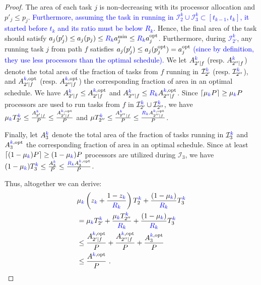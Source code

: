 \documentclass{article}
\newcommand\ratio{R\xspace}
\newcommand\opt{\textnormal{opt}\xspace}
\newcommand{\new}[1]{\textcolor{blue}{#1}}
\begin{document}
\begin{proof}
The area of each task $j$  is non-decreasing with its processor allocation and $p'_j \le p_j$.  \new{Furthermore, assuming the task in running in $\mathcal{I}_{2}^{k} \cup \mathcal{I}_{3}^{k} \subset [t_{k-1},t_k]$, it started before $t_k$ and its ratio must be below $\ratio_k$}. Hence, the final area of the task should satisfy $a_j(p'_j) \le a_j(p_j) \le \new{\ratio_k} a_j^{\min} \leq \new{\ratio_k} a_j^{\opt}$. Furthermore, during \new{$\mathcal{I}_{2'}^k$}, any running task $j$ from path $f$ satisfies $a_j(p'_j) \leq a_j(p_j^{\opt})=a_j^{\opt}$ \new{(since by definition, they use less processors than the optimal schedule).} We let $A_{2'|f}^{\new{k}}$ (resp. $A_{2''|f}^{\new{k}}$) denote the total area of the fraction of tasks from $f$ running in $\mathcal{I}_{2'}^{\new{k}}$ (resp. $\mathcal{I}_{2''}^{\new{k}}$), and $A^{{\new{k}},\opt}_{2'|f}$ (resp. $A^{{\new{k}},\opt}_{2''|f}$) the corresponding fraction of area in an optimal schedule. We have $A_{2'|f}^{\new{k}} \leq A^{{\new{k}},\opt}_{2'|f}$ and $A_{2''|f}^{\new{k}} \leq \new{\ratio_k} A^{{\new{k}},\opt}_{2''|f}$. Since $\lceil \mu_{\new{k}} P \rceil \geq \mu_{\new{k}} P$ processors are used to run tasks from $f$ in $\mathcal{I}_{2'}^{\new{k}} \cup \mathcal{I}_{2''}^{\new{k}}$, we have $\mu_{\new{k}} T_{2'}^{\new{k}} \leq \frac{{A_{2'}^{\new{k}}}_{|f}}{P} \le \frac{A^{\new{k},\opt}_{2'|f}}{P}$ and $\mu T_{2''}^{\new{k}} \leq \frac{{A_{2''}^{\new{k}}}_{|f}}{P} \le \frac{\new{\ratio_k} A^{\new{k},\opt}_{2''|f}}{P}$.

Finally, let $A_3^{\new{k}}$ denote the total area of the fraction of tasks running in $\mathcal{I}_{3}^{\new{k}}$ and $A_3^{\new{k},\opt}$ the corresponding fraction of area in an optimal schedule. Since at least $\lceil (1-\mu_{\new{k}})P \rceil \ge (1-\mu_{\new{k}})P$ processors are utilized during $\mathcal{I}_{3}$, we have $(1-\mu_{\new{k}}) T_3^{\new{k}} \le \frac{A_3^{\new{k}}}{P} \le \frac{\new{\ratio_k} A_3^{\new{k},\opt}}{P}$.

Thus, altogether we can derive:
\begin{align*}
& \mu_{\new{k}} \left( z_{\new{k}}+\frac{1-z_{\new{k}}}{\new{\ratio_k}} \right)T_2^{\new{k}} + \frac{(1-\mu_{\new{k}})}{\new{\ratio_k}} T_3^{\new{k}} \\
&= \mu_{\new{k}} T_{2'}^{\new{k}} + \frac{\mu_{\new{k}} T_{2''}^{\new{k}}}{\new{\ratio_k}} + \frac{(1-\mu_{\new{k}})}{\new{\ratio_k}} T_3^{\new{k}}\\
& \leq  \frac{A^{\new{k},\opt}_{2'|f}}{P} + \frac{A^{\new{k},\opt}_{2''|f}}{P}+\frac{A^{\new{k},\opt}_3}{P} \\
& \leq \frac{A^{\new{k},\opt}}{P}\ .
\end{align*}

\end{proof}
\end{document}
